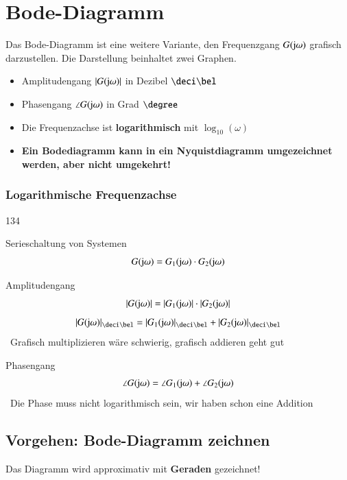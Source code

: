 \section{Bode-Diagramm}

Das Bode-Diagramm ist eine weitere Variante, den Frequenzgang $G(\mathrm{j} \omega)$ grafisch darzustellen.
Die Darstellung beinhaltet zwei Graphen.

\begin{itemize}
    \item Amplitudengang $|G(\mathrm{j} \omega)|$ in Dezibel $\deci \bel$
    \item Phasengang $\angle G(\mathrm{j} \omega)$ in Grad $\degree$
    \item Die Frequenzachse ist \textbf{logarithmisch} mit $\log_{10}(\omega)$
    \item \textbf{Ein Bodediagramm kann in ein Nyquistdiagramm umgezeichnet werden, aber nicht umgekehrt!}
\end{itemize}


\subsubsection{Logarithmische Frequenzachse}{134}

\begin{outline}
    \1 Serieschaltung von Systemen
        $$ G(\mathrm{j} \omega) = G_1(\mathrm{j} \omega) \cdot G_2(\mathrm{j} \omega) $$

        \2 Amplitudengang
            $$ |G(\mathrm{j} \omega)| = |G_1(\mathrm{j} \omega)| \cdot |G_2(\mathrm{j} \omega)| $$
            $$ |G(\jimg \omega)|_{\deci \bel} = |G_1(\jimg \omega)|_{\deci \bel} + |G_2(\jimg \omega)|_{\deci \bel} $$
            \textrightarrow\ Grafisch multiplizieren wäre schwierig, grafisch addieren geht gut

        \2 Phasengang
            $$ \angle G(\mathrm{j} \omega) = \angle G_1(\mathrm{j} \omega) +  \angle G_2(\mathrm{j} \omega) $$
            \textrightarrow\ Die Phase muss nicht logarithmisch sein, wir haben schon eine Addition 
\end{outline}


\subsection{Vorgehen: Bode-Diagramm zeichnen}
\label{Bodediagramm zeichnen}

Das Diagramm wird approximativ mit \textbf{Geraden} gezeichnet!

